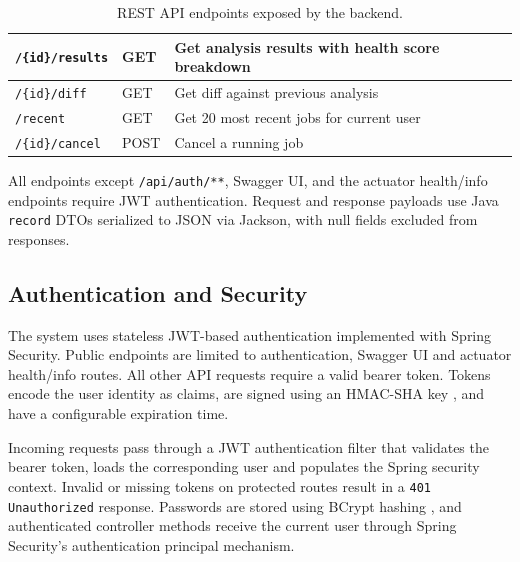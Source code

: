 \begin{table}[htbp]
\begin{tabular}{|l|l|p{6cm}|}
        \hline
        \texttt{/\{id\}/results}   & GET             & Get analysis results with health score breakdown \\
        \hline
        \texttt{/\{id\}/diff}      & GET             & Get diff against previous analysis               \\
        \hline
        \texttt{/recent}           & GET             & Get 20 most recent jobs for current user         \\
        \hline
        \texttt{/\{id\}/cancel}    & POST            & Cancel a running job                             \\
        \hline
    \end{tabular}
    \caption{REST API endpoints exposed by the backend.}
    \label{tab:api-endpoints}
\end{table}

All endpoints except \texttt{/api/auth/**}, Swagger UI, and the actuator health/info endpoints require JWT authentication. Request and response payloads use Java \texttt{record} DTOs serialized to JSON via Jackson, with null fields excluded from responses.

\subsection{Authentication and Security}
\label{subsec:auth-security}

\par The system uses stateless JWT-based authentication \cite{RFC7519} implemented with Spring Security. Public endpoints are limited to authentication, Swagger UI and actuator health/info routes. All other API requests require a valid bearer token. Tokens encode the user identity as claims, are signed using an HMAC-SHA key \cite{RFC4634}, and have a configurable expiration time.

\par Incoming requests pass through a JWT authentication filter that validates the bearer token, loads the corresponding user and populates the Spring security context. Invalid or missing tokens on protected routes result in a \texttt{401 Unauthorized} response. Passwords are stored using BCrypt hashing \cite{Provos1999}, and authenticated controller methods receive the current user through Spring Security's authentication principal mechanism.


